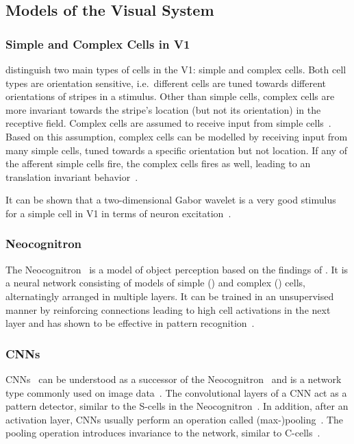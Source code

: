 \subsection{Models of the Visual System}\label{subsec:models-of-the-visual-system}


\subsubsection{Simple and Complex Cells in \acl{V1}}\label{subsubseq:simple_complex_cells}

\citet{hubel1962receptive} distinguish two main types of cells in the \ac{V1}: simple and complex cells.
Both cell types are orientation sensitive, i.e.~different cells are tuned towards different orientations of stripes in a stimulus.
Other than simple cells, complex cells are more invariant towards the stripe's location (but not its orientation) in the receptive field.
Complex cells are assumed to receive input from simple cells~\citep{hubel1962receptive}.
Based on this assumption, complex cells can be modelled by receiving input from many simple cells, tuned towards a specific orientation but not location.
If any of the afferent simple cells fire, the complex cells fires as well, leading to an translation invariant behavior~\citep{hubel1962receptive}.

It can be shown that a two-dimensional Gabor wavelet is a very good stimulus for a simple cell in \ac{V1} in terms of neuron excitation~\citep{jones1987evaluation}.

\subsubsection{Neocognitron}

The Neocognitron~\citep{fukushima1980neocognitron} is a model of object perception based on the findings of \citet{hubel1962receptive}.
It is a neural network consisting of models of simple () and complex () cells, alternatingly arranged in multiple layers.
It can be trained in an unsupervised manner by reinforcing connections leading to high cell activations in the next layer and has shown to be effective in pattern recognition~\citep{fukushima1980neocognitron}.

\subsubsection{\aclp{CNN}}\label{subsubsec:cnn_model_visual_system}
\acp{CNN}~\citep{lecun1989backpropagation} can be understood as a successor of the Neocognitron~\citep{lindsay2020convolutional} and is a network type commonly used on image data~\citep[p. 326]{Goodfellow-et-al-2016}.
The convolutional layers of a \ac{CNN} act as a pattern detector, similar to the S-cells in the Neocognitron~\citep{lindsay2020convolutional}.
In addition, after an activation layer, \acp{CNN} usually perform an operation called (max-)pooling~\citep[pp. 326, 339]{Goodfellow-et-al-2016}.
The pooling operation introduces invariance to the network, similar to C-cells~\citep{lindsay2020convolutional}.

